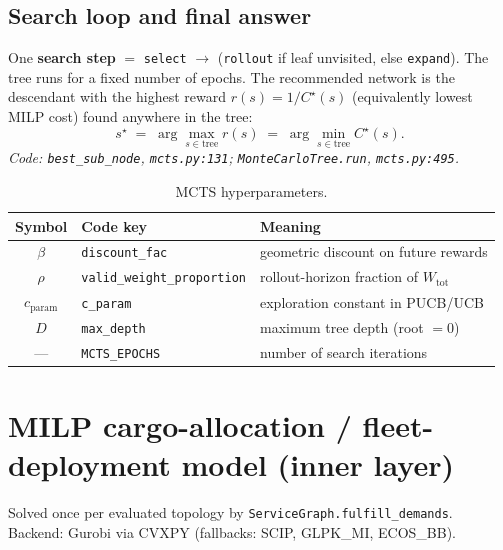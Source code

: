 \documentclass[11pt]{article}
\begin{document}
\subsection{Search loop and final answer}
One \textbf{search step} $=$ \texttt{select} $\to$ (\texttt{rollout} if leaf unvisited,
else \texttt{expand}). The tree runs for a fixed number of epochs. The recommended
network is the descendant with the highest reward $r(s)=1/C^\star(s)$ (equivalently
lowest MILP cost) found anywhere in the tree:
\begin{equation}
  s^\star \;=\; \arg\max_{s\in\text{tree}} r(s)
  \;=\; \arg\min_{s\in\text{tree}} C^\star(s).
\end{equation}
\textit{Code: \texttt{best\_sub\_node}, \texttt{mcts.py:131}; \texttt{MonteCarloTree.run},
\texttt{mcts.py:495}.}

\begin{table}[h]
\centering
\caption{MCTS hyperparameters.}
\begin{tabular}{@{}clp{7.5cm}@{}}
\toprule
Symbol & Code key & Meaning \\
\midrule
$\beta$ & \texttt{discount\_fac} & geometric discount on future rewards \\
$\rho$ & \texttt{valid\_weight\_proportion} & rollout-horizon fraction of $W_{\text{tot}}$ \\
$c_{\text{param}}$ & \texttt{c\_param} & exploration constant in PUCB/UCB \\
$D$ & \texttt{max\_depth} & maximum tree depth (root $=0$) \\
--- & \texttt{MCTS\_EPOCHS} & number of search iterations \\
\bottomrule
\end{tabular}
\end{table}

\section{MILP cargo-allocation / fleet-deployment model (inner layer)}
\label{sec:milp}
Solved once per evaluated topology by \texttt{ServiceGraph.fulfill\_demands}. Backend:
Gurobi via CVXPY (fallbacks: SCIP, GLPK\_MI, ECOS\_BB).
\end{document}
